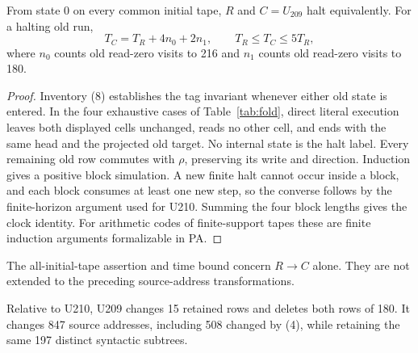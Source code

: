 \begin{lemma}\label{lem:209fold}
From state 0 on every common initial tape, \(R\) and \(C=U_{209}\) halt
equivalently. For a halting old run,
\[
 T_C=T_R+4n_0+2n_1,\qquad T_R\le T_C\le5T_R,
\]
where \(n_0\) counts old read-zero visits to 216 and \(n_1\) counts old
read-zero visits to 180.
\end{lemma}
\begin{proof}
Inventory (8) establishes the tag invariant whenever either old state is
entered. In the four exhaustive cases of Table~\ref{tab:fold}, direct literal
execution leaves both displayed cells unchanged, reads no other cell, and
ends with the same head and the projected old target. No internal state is
the halt label. Every remaining old row commutes with \(\rho\), preserving
its write and direction. Induction gives a positive block simulation.
A new finite halt cannot occur inside a block, and each block consumes at
least one new step, so the converse follows by the finite-horizon argument
used for U210. Summing the four block lengths gives the clock identity.
For arithmetic codes of finite-support tapes these are finite induction
arguments formalizable in PA.
\end{proof}

The all-initial-tape assertion and time bound concern \(R\to C\) alone.
They are not extended to the preceding source-address transformations.

Relative to U210, U209 changes 15 retained rows and deletes both rows of 180.
It changes 847 source addresses, including 508 changed by (4), while retaining
the same 197 distinct syntactic subtrees.
